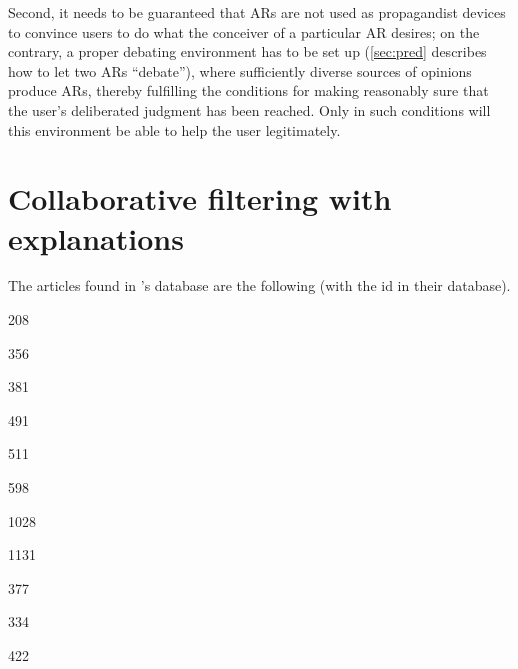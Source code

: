 \documentclass[version=3.21, pagesize, twoside=off, bibliography=totoc, DIV=calc, fontsize=12pt, a4paper, french, english]{scrartcl}
\begin{document}
Second, it needs to be guaranteed that \acp{AR} are not used as propagandist devices to convince users to do what the conceiver of a particular \ac{AR} desires; on the contrary, a proper debating environment has to be set up (\cref{sec:pred} describes how to let two \acp{AR} “debate”), where sufficiently diverse sources of opinions produce \acp{AR}, thereby fulfilling the conditions for making reasonably sure that the user’s deliberated judgment has been reached. Only in such conditions will this environment be able to help the user legitimately.



\appendix
\section{Collaborative filtering with explanations}
The articles found in \citet{nunes_systematic_2017}’s database are the following (with the id in their database).
\begin{description}
	\item[208]  \citet{cleger-tamayo_explaining_2012}
	\item[356]  \citet{gedikli_understanding_2011}
	\item[381]  \citet{gedikli_how_2014}
	\item[491]  \citet{gkika_investigating_2014}
	\item[511]  \citet{guy_personalized_2009}
	\item[598]  \citet{herlocker_explaining_2000}
	\item[1028]  \citet{hu_collaborative_2008}
	\item[1131]  \citet{marx_increasing_2010}
	\item[377]  \citet{odonovan_visual_2009}
	\item[334]  \citet{symeonidis_providing_2008}
	\item[422]  \citet{yu_it_2009}
\end{description}
\end{document}
